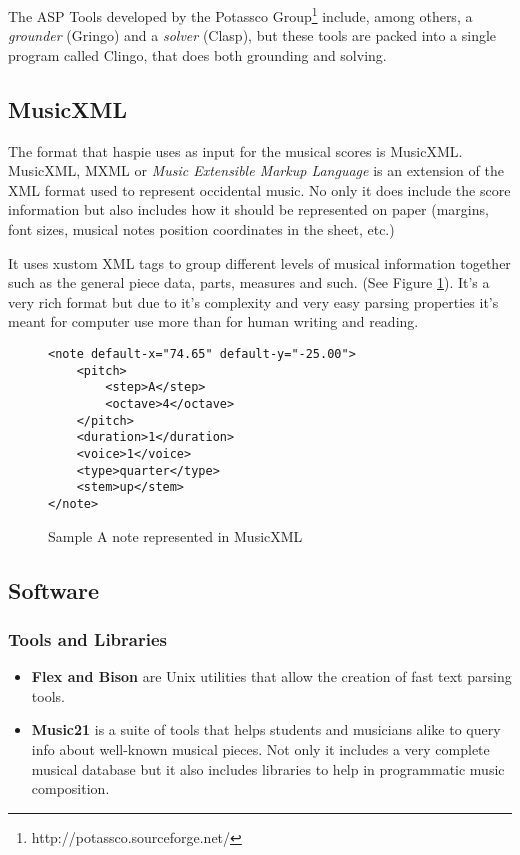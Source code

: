The ASP Tools developed by the Potassco Group\footnote{http://potassco.sourceforge.net/} include, among others, a \textit{grounder} (Gringo) and a \textit{solver} (Clasp), but these tools are packed into a single program called Clingo, that does both grounding and solving.

\subsection{MusicXML}
\label{subsec:formats}
The format that haspie uses as input for the musical scores is MusicXML. MusicXML, MXML or \textit{Music Extensible Markup Language} is an extension of the XML format used to represent occidental music. No only it does include the score information but also includes how it should be represented on paper (margins, font sizes, musical notes position coordinates in the sheet, etc.)

It uses xustom XML tags to group different levels of musical information together such as the general piece data, parts, measures and such. (See Figure \ref{fig:nota_musicxml}). It's a very rich format but due to it's complexity and very easy parsing properties it's meant for computer use more than for human writing and reading.

\begin{figure}[h!]
	\centering
	\begin{Verbatim}[frame=single]
<note default-x="74.65" default-y="-25.00">
	<pitch>
		<step>A</step>
		<octave>4</octave>
	</pitch>
	<duration>1</duration>
	<voice>1</voice>
	<type>quarter</type>
	<stem>up</stem>
</note>
	\end{Verbatim}
	\caption{Sample A note represented in MusicXML}
	\label{fig:nota_musicxml}
\end{figure}


\subsection{Software}
\label{subsec:software}
\subsubsection{Tools and Libraries}
\begin{itemize}
	\item \textbf{Flex and Bison} are Unix utilities that allow the creation of fast text parsing tools.
	\item \textbf{Music21} is a suite of tools that helps students and musicians alike to query info about well-known musical pieces. Not only it includes a very complete musical database but it also includes libraries to help in programmatic music composition.
\end{itemize}

